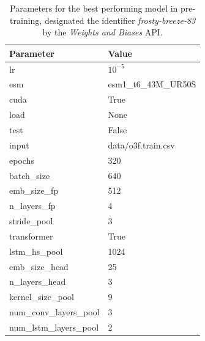 \documentclass{article}
\begin{document}
\begin{table}
	\caption{\label{frostybreezeparams} Parameters for the best performing model in pre-training, designated the identifier \textit{frosty-breeze-83} by the \textit{Weights and Biases} API.}
	\begin{center}
	\begin{tabular}{ll}
		\textbf{Parameter} &     \textbf{Value} \\
		\hline
		lr                   &             $10^{-5}$ \\
		esm                  &   esm1\_t6\_43M\_UR50S \\
		cuda                 &                True \\
		load                 &                None \\
		test                 &               False \\
		input                &  data/o3f.train.csv \\
		epochs               &                320 \\
		batch\_size           &                640 \\
		emb\_size\_fp          &               512 \\
		n\_layers\_fp          &                 4 \\
		stride\_pool          &                 3 \\
		transformer          &                True \\
		lstm\_hs\_pool         &              1024 \\
		emb\_size\_head        &              25 \\
		n\_layers\_head        &                 3 \\
		kernel\_size\_pool     &                 9 \\
		num\_conv\_layers\_pool &                 3 \\
		num\_lstm\_layers\_pool &                 2 \\
	\end{tabular}
	\end{center}
\end{table}
\end{document}
